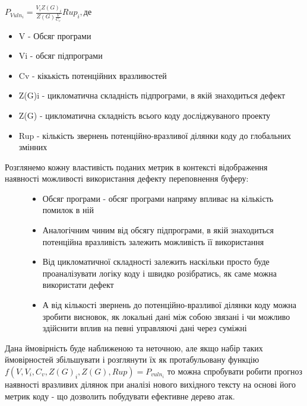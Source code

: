 \documentclass[oneside,final,14pt]{extreport}
\begin{document}
$P_{Vuln_i} = \frac{V_i Z(G)_i}{Z(G) \frac{V}{C_v}}Rup_i, де$
\begin{itemize}
\item {} 
V - Обсяг програми

\item {} 
Vi - обсяг підпрограми

\item {} 
Cv - кікькість потенційних вразливостей

\item {} 
Z(G)i - цикломатична складність підпрограми, в якій знаходиться дефект

\item {} 
Z(G) - цикломатична складність всього коду досліджуваного проекту

\item {} 
Rup - кількість звернень потенційно-вразливої ділянки коду до глобальних змінних

\end{itemize}
\begin{description}
\item[{Розглянемо кожну властивість поданих метрик в контексті відображення наявності можливості використання дефекту переповнення буферу:}] \leavevmode\begin{itemize}
\item {} 
Обсяг програми - обсяг програми напряму впливає на кількість помилок в ній

\item {} 
Аналогічним чиним від обсягу підпрограми, в якій знаходиться потенційна вразливість залежить можливість її використання

\item {} 
Від цикломатичної складності залежить наскільки просто буде проаналізувати логіку коду і швидко розібратись, як саме можна використати дефект

\item {} 
А від кількості звернень до потенційно-вразливої ділянки коду можна зробити висновок, як локальні дані між собою звязані і чи можливо здійснити вплив на певні управляючі дані через суміжні

\end{itemize}

\end{description}

Дана ймовірність буде наближеною та неточною, але якщо набір таких ймовірностей збільшувати і розглянути їх як протабульовану функцію
$f(V,V_i,C_v,Z(G)_i,Z(G),Rup) = P_{vuln_i}$
то можна спробувати робити прогноз наявності вразливих ділянок при аналізі нового вихідного тексту на основі  його метрик коду - що дозволить побудувати ефективне дерево атак.
\end{document}
